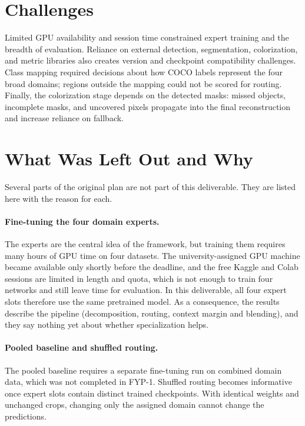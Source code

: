 \documentclass{FastFyp}
\begin{document}
\section{Challenges}
\label{sec:challenges}
Limited GPU availability and session time constrained expert training and
the breadth of evaluation. Reliance on external detection, segmentation,
colorization, and metric libraries also creates version and checkpoint
compatibility challenges. Class mapping required decisions about how COCO
labels represent the four broad domains; regions outside the mapping could
not be scored for routing. Finally, the colorization stage depends on the
detected masks: missed objects, incomplete masks, and uncovered pixels
propagate into the final reconstruction and increase reliance on fallback.


\section{What Was Left Out and Why}
\label{sec:omitted-work}
Several parts of the original plan are not part of this deliverable. They are listed here with the reason for each.

\paragraph{Fine-tuning the four domain experts.} The experts are the central idea of the framework, but training them requires many hours of GPU time on four datasets. The university-assigned GPU machine became available only shortly before the deadline, and the free Kaggle and Colab sessions are limited in length and quota, which is not enough to train four networks and still leave time for evaluation. In this deliverable, all four expert slots therefore use the same pretrained model. As a consequence, the results describe the pipeline (decomposition, routing, context margin and blending), and they say nothing yet about whether specialization helps.

\paragraph{Pooled baseline and shuffled routing.} The pooled baseline requires a separate fine-tuning run on combined domain data, which was not completed in FYP-1. Shuffled routing becomes informative once expert slots contain distinct trained checkpoints. With identical weights and unchanged crops, changing only the assigned domain cannot change the predictions.
\end{document}
